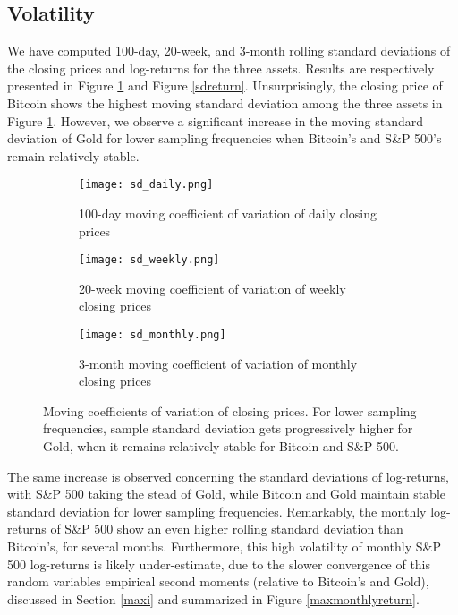 \documentclass[12pt]{article}
\begin{document}
\subsection{Volatility}
\label{vol}
We have computed 100-day, 20-week, and 3-month rolling standard deviations of the closing prices and log-returns for the three assets. Results are respectively presented in Figure \ref{sd} and Figure \ref{sdreturn}. Unsurprisingly, the closing price of Bitcoin shows the highest moving standard deviation among the three assets in Figure \ref{sd}. However, we observe a significant increase in the moving standard deviation of Gold for lower sampling frequencies when Bitcoin's and S\&P 500's remain relatively stable. 
\begin{figure}[H]
\centering
\begin{subfigure}[b]{.32\textwidth}
\texttt{[image: sd\_daily.png]}\hfill
\caption{100-day moving coefficient of variation of daily closing prices}
\end{subfigure}
 \hfill
\begin{subfigure}[b]{.32\textwidth}
\texttt{[image: sd\_weekly.png]}\hfill
\caption{20-week moving coefficient of variation of weekly closing prices}
\end{subfigure}
 \hfill
\begin{subfigure}[b]{.32\textwidth}
\texttt{[image: sd\_monthly.png]}\hfill
\caption{3-month moving coefficient of variation of monthly closing prices}
\end{subfigure}
\caption{Moving coefficients of variation of closing prices. For lower sampling frequencies, sample standard deviation gets progressively higher for Gold, when it remains relatively stable for Bitcoin and S\&P 500.}
\label{sd}
\end{figure}
The same increase is observed concerning the standard deviations of log-returns, with S\&P 500 taking the stead of Gold, while Bitcoin and Gold maintain stable standard deviation for lower sampling frequencies.  Remarkably, the monthly log-returns of S\&P 500 show an even higher rolling standard deviation than Bitcoin's, for several months. Furthermore, this high volatility of monthly S\&P 500 log-returns is likely under-estimate, due to the slower convergence of this random variables empirical second moments (relative to Bitcoin's and Gold), discussed in Section \ref{maxi} and summarized in Figure \ref{maxmonthlyreturn}.  
\end{document}
